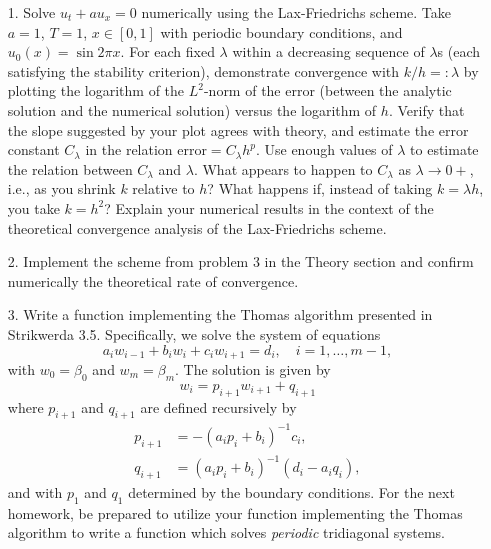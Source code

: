 \documentclass{article}
\begin{document}
\begin{itemize}

\item[1.] Solve $u_t + a u_x = 0$ numerically using the Lax-Friedrichs scheme. Take $a = 1$, $T = 1$, $x \in [0,1]$ with periodic boundary conditions, and $u_0(x) = \sin 2 \pi x$. For each fixed $\lambda$ within a decreasing sequence of $\lambda$s (each satisfying the stability criterion), demonstrate convergence with $k/h =: \lambda$ by plotting the logarithm of the $L^2$-norm of the error (between the analytic solution and the numerical solution) versus the logarithm of $h$. Verify that the slope suggested by your plot agrees with theory, and estimate the error constant $C_{\lambda}$ in the relation $\text{error} = C_{\lambda} h^p$. Use enough values of $\lambda$ to estimate the relation between $C_{\lambda}$ and $\lambda$. What appears to happen to $C_{\lambda}$ as $\lambda \to 0+$, i.e., as you shrink $k$ relative to $h$? What happens if, instead of taking $k = \lambda h$, you take $k = h^2$? Explain your numerical results in the context of the theoretical convergence analysis of the Lax-Friedrichs scheme.

\item[2.] Implement the scheme from problem 3 in the Theory section and confirm numerically the theoretical rate of convergence.

\item[3.] Write a function implementing the Thomas algorithm presented in Strikwerda 3.5. Specifically, we solve the system of equations
\begin{equation*}
a_i w_{i-1} + b_i w_i + c_i w_{i+1} = d_i, \quad i = 1, \dotsc, m-1,
\end{equation*}
with $w_0 = \beta_0$ and $w_m = \beta_m$. The solution is given by
\begin{equation*}
w_i = p_{i+1} w_{i+1} + q_{i+1}
\end{equation*}
where $p_{i+1}$ and $q_{i+1}$ are defined recursively by
\begin{align*}
p_{i+1} & = -\left( a_i p_i + b_i \right)^{-1} c_i, \\
q_{i+1} & = \left( a_i p_i + b_i \right)^{-1} \left( d_i - a_i q_i \right),
\end{align*}
and with $p_1$ and $q_1$ determined by the boundary conditions. For the next homework, be prepared to utilize your function implementing the Thomas algorithm to write a function which solves \emph{periodic} tridiagonal systems.

\end{itemize}
\end{document}
